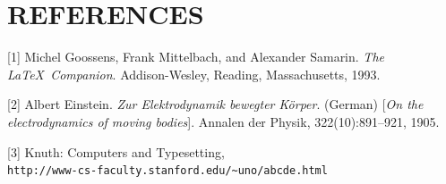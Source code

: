 \documentclass[a4paper]{IEEEtran}
\begin{document}
\section{\textbf{REFERENCES}}

[1] Michel Goossens, Frank Mittelbach, and Alexander Samarin.
\textit{The \LaTeX\ Companion}.
Addison-Wesley, Reading, Massachusetts, 1993.

[2] Albert Einstein.
\textit{Zur Elektrodynamik bewegter K{\"o}rper}. (German)
[\textit{On the electrodynamics of moving bodies}].
Annalen der Physik, 322(10):891–921, 1905.


[3] Knuth: Computers and Typesetting,
\\\texttt{http://www-cs-faculty.stanford.edu/\~{}uno/abcde.html}
\end{document}
